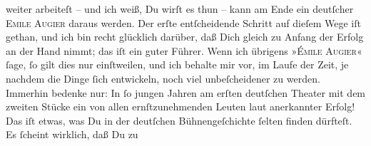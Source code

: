                weiter arbeiteſt – und ich weiß, Du wirſt es thun – kann am Ende ein deutſcher \textsc{Emile Augier} daraus werden. Der erſte entſcheidende Schritt auf dieſem Wege iſt gethan, und
               ich bin recht glücklich darüber, daß Dich gleich zu Anfang der Erfolg \strikeout{\textcolor{gray}{in die Hand}} an der Hand nimmt; das iſt ein guter Führer. Wenn ich übrigens »\textsc{Émile Augier}« ſage, ſo gilt dies nur einſtweilen, und ich behalte mir vor, im Laufe der
               Zeit, je nachdem die Dinge ſich entwickeln, {\pb}noch
               viel unbeſcheidener zu werden. Immerhin bedenke nur: In ſo jungen Jahren am erſten
               deutſchen Theater mit dem
               zweiten Stücke ein von allen
                   ernſtzunehmenden Leuten laut anerkannter Erfolg! Das iſt etwas, was Du in der
               deutſchen Bühnengeſchichte ſelten finden dürfteſt. Es ſcheint wirklich, daß Du zu
